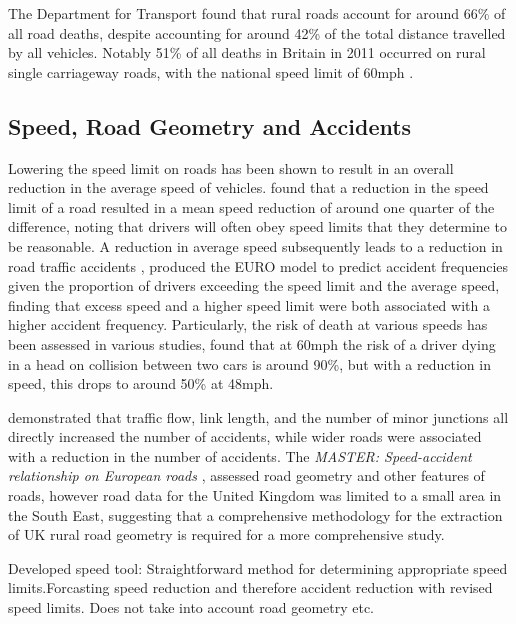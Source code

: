 \begin{multicols}{2}
The Department for Transport found that rural roads account for around 66\% of all road deaths, despite accounting for around 42\% of the total distance travelled by all vehicles. Notably 51\% of all deaths in Britain in 2011 occurred on rural single carriageway roads, with the national speed limit of 60mph \citep{departmentfortransport2011}. 


\subsection{Speed, Road Geometry and Accidents}

Lowering the speed limit on roads has been shown to result in an overall reduction in the average speed of vehicles. \cite{finch1994} found that a reduction in the speed limit of a road resulted in a mean speed reduction of around one quarter of the difference, noting that drivers will often obey speed limits that they determine to be reasonable. A reduction in average speed subsequently leads to a reduction in road traffic accidents \citep{finch1994;taylor2002}, \cite{taylor2000} produced the EURO model to predict accident frequencies given the proportion of drivers exceeding the speed limit and the average speed, finding that excess speed and a higher speed limit were both associated with a higher accident frequency.  Particularly, the risk of death at various speeds has been assessed in various studies, \cite{richards2009} found that at 60mph the risk of a driver dying in a head on collision between two cars is around 90\%, but with a reduction in speed, this drops to around 50\% at 48mph.

\cite{taylor2000}  demonstrated that traffic flow, link length, and the number of minor junctions all directly increased the number of accidents, while wider roads were associated with a reduction in the number of accidents. The \textit{MASTER: Speed-accident relationship on European roads} \citep{baruya1998}, assessed road geometry and other features of roads, however road data for the United Kingdom was limited to a small area in the South East, suggesting that a comprehensive methodology for the extraction of UK rural road geometry is required for a more comprehensive study.

Developed speed tool:
\citep{departmentfortransport2013a} Straightforward method for determining appropriate speed limits.Forcasting speed reduction and therefore accident reduction with revised speed limits. Does not take into account road geometry etc.


\end{multicols}

